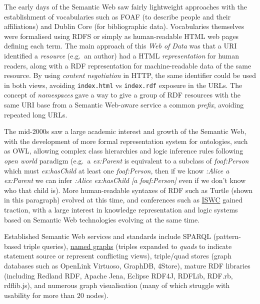 \documentclass[fleqn,10pt,lineno]{wlpeerj}
\begin{document}
The early days of the Semantic Web saw fairly lightweight approaches with the establishment of vocabularies such as FOAF (to describe people and their affiliations) and Dublin Core (for bibliographic data). Vocabularies themselves were formalised using RDFS or simply as human-readable HTML web pages defining each term. The main approach of this \emph{Web of Data} was that a URI identified a \emph{resource} (e.g.~an author) had a HTML \emph{representation} for human readers, along with a RDF representation for machine-readable data of the same resource. By using \emph{content negotiation} in HTTP, the same identifier could be used in both views, avoiding \texttt{index.html} vs \texttt{index.rdf} exposure in the URLs. The concept of \emph{namespaces} gave a way to give a group of RDF resources with the same URI base from a Semantic Web-aware service a common \emph{prefix}, avoiding repeated long URLs.

The mid-2000s saw a large academic interest and growth of the Semantic Web, with the development of more formal representation system for ontologies, such as OWL, allowing complex class hierarchies and logic inference rules following \emph{open world} paradigm (e.g.~a \emph{ex:Parent} is equivalent to a subclass of \emph{foaf:Person} which must \emph{ex:hasChild} at least one \emph{foaf:Person}, then if we know \emph{:Alice a ex:Parent} we can infer \emph{:Alice ex:hasChild {[}a foaf:Person{]}} even if we don't know who that child is). More human-readable syntaxes of RDF such as Turtle (shown in this paragraph) evolved at this time, and conferences such as \href{https://iswc2022.semanticweb.org/}{ISWC} \cite{yd2WE9eq} gained traction, with a large interest in knowledge representation and logic systems based on Semantic Web technologies evolving at the same time.

Established Semantic Web services and standards include SPARQL \cite{xww8fb1B} (pattern-based triple queries), \href{https://www.w3.org/TR/rdf11-concepts/\#section-dataset}{named graphs} (triples expanded to \emph{quads} to indicate statement source or represent conflicting views), triple/quad stores (graph databases such as OpenLink Virtuoso, GraphDB, 4Store), mature RDF libraries (including Redland RDF, Apache Jena, Eclipse RDF4J, RDFLib, RDF.rb, rdflib.js), and numerous graph visualisation (many of which struggle with usability for more than 20 nodes).
\end{document}

